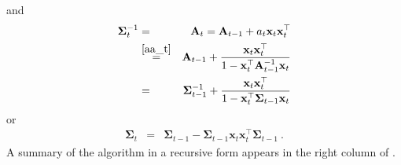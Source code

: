 and
\begin{eqnarray*}
\mathbf{\Sigma}_{t}^{-1} & = & \mathbf{A}_{t}=\mathbf{A}_{t-1}+a_{t}\mathbf{x}_{t}\mathbf{x}_{t}^{\top}  \\
 & \overset{\eqref{aa_t}}{=} & \mathbf{A}_{t-1}+\frac{\mathbf{x}_{t}\mathbf{x}_{t}^{\top}}{1-\mathbf{x}_{t}^{\top}\mathbf{A}_{t-1}^{-1}\mathbf{x}_{t}} \\
 & = & \mathbf{\Sigma}_{t-1}^{-1}+\frac{\mathbf{x}_{t}\mathbf{x}_{t}^{\top}}{1-\mathbf{x}_{t}^{\top}\mathbf{\Sigma}_{t-1}\mathbf{x}_{t}} \end{eqnarray*}
or
\begin{eqnarray}
\mathbf{\Sigma}_{t} & = & \mathbf{\Sigma}_{t-1}-\mathbf{\Sigma}_{t-1}\mathbf{x}_{t}\mathbf{x}_{t}^{\top}\mathbf{\Sigma}_{t-1}~. \label{sigma_t}
\end{eqnarray}
A summary of the algorithm in a recursive form appears in the right column of .


